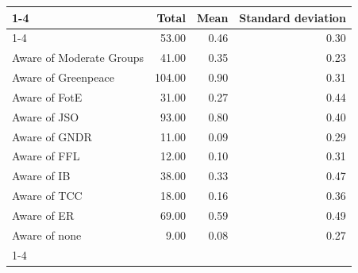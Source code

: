 \documentclass{article}
\begin{document}
\begin{table}[!h]
\centering
\begin{tabular}{llll}
\cline{1-4}
\multicolumn{1}{c}{} &
  \multicolumn{1}{|r}{Total} &
  \multicolumn{1}{r}{Mean} &
  \multicolumn{1}{r}{Standard deviation} \\
\cline{1-4}
\multicolumn{1}{l}{Aware of Radical Groups} &
  \multicolumn{1}{|r}{53.00} &
  \multicolumn{1}{r}{0.46} &
  \multicolumn{1}{r}{0.30} \\
\multicolumn{1}{l}{Aware of Moderate Groups} &
  \multicolumn{1}{|r}{41.00} &
  \multicolumn{1}{r}{0.35} &
  \multicolumn{1}{r}{0.23} \\
\multicolumn{1}{l}{Aware of Greenpeace} &
  \multicolumn{1}{|r}{104.00} &
  \multicolumn{1}{r}{0.90} &
  \multicolumn{1}{r}{0.31} \\
\multicolumn{1}{l}{Aware of FotE} &
  \multicolumn{1}{|r}{31.00} &
  \multicolumn{1}{r}{0.27} &
  \multicolumn{1}{r}{0.44} \\
\multicolumn{1}{l}{Aware of JSO} &
  \multicolumn{1}{|r}{93.00} &
  \multicolumn{1}{r}{0.80} &
  \multicolumn{1}{r}{0.40} \\
\multicolumn{1}{l}{Aware of GNDR} &
  \multicolumn{1}{|r}{11.00} &
  \multicolumn{1}{r}{0.09} &
  \multicolumn{1}{r}{0.29} \\
\multicolumn{1}{l}{Aware of FFL} &
  \multicolumn{1}{|r}{12.00} &
  \multicolumn{1}{r}{0.10} &
  \multicolumn{1}{r}{0.31} \\
\multicolumn{1}{l}{Aware of IB} &
  \multicolumn{1}{|r}{38.00} &
  \multicolumn{1}{r}{0.33} &
  \multicolumn{1}{r}{0.47} \\
\multicolumn{1}{l}{Aware of TCC} &
  \multicolumn{1}{|r}{18.00} &
  \multicolumn{1}{r}{0.16} &
  \multicolumn{1}{r}{0.36} \\
\multicolumn{1}{l}{Aware of ER} &
  \multicolumn{1}{|r}{69.00} &
  \multicolumn{1}{r}{0.59} &
  \multicolumn{1}{r}{0.49} \\
\multicolumn{1}{l}{Aware of none} &
  \multicolumn{1}{|r}{9.00} &
  \multicolumn{1}{r}{0.08} &
  \multicolumn{1}{r}{0.27} \\
\cline{1-4}
\end{tabular}
\end{table}
\end{document}
